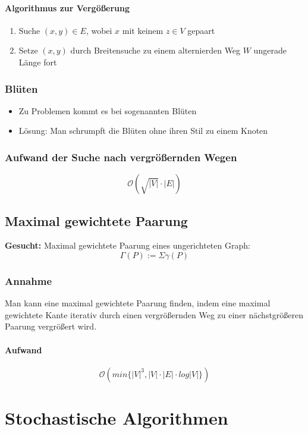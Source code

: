 \paragraph{Algorithmus zur Vergößerung}
\begin{enumerate}
	\item Suche \((x,y) \in E\), wobei \(x\) mit keinem \(z\in V\) gepaart
	\item Setze \((x,y)\) durch Breitensuche zu einem alternierden Weg \(W\) ungerade Länge fort
\end{enumerate}


\subsubsection{Blüten}
\begin{itemize}
	\item Zu Problemen kommt es bei sogenannten Blüten
	\item Lösung: Man schrumpft die Blüten ohne ihren Stil zu einem Knoten
\end{itemize}

\subsubsection{Aufwand der Suche nach vergrößernden Wegen}
\[\mathcal{O}(\sqrt{|V|} \cdot |E|)\]


\subsection{Maximal gewichtete Paarung}
\textbf{Gesucht:} Maximal gewichtete Paarung eines ungerichteten Graph:
\[\Gamma(P) := \Sigma \gamma (P)\]

\subsubsection{Annahme}
Man kann eine maximal gewichtete Paarung finden, indem eine maximal gewichtete Kante iterativ durch einen vergrößernden Weg zu einer nächstgrößeren Paarung vergrößert wird.

\paragraph{Aufwand}
\[\mathcal{O}(min\{|V|^3, |V| \cdot |E| \cdot log|V|\})\]



\section{Stochastische Algorithmen}

